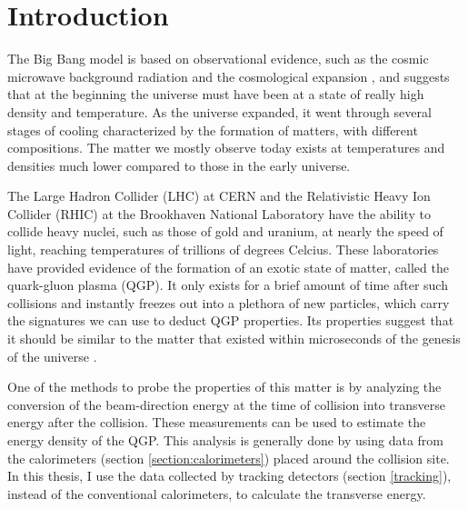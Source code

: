 \chapter{Introduction} \label{ch:introduction}

The Big Bang model is based on observational evidence, such as the cosmic microwave background radiation and the cosmological expansion \cite{Scott:2005uf,Perlmutter:1998np}, and suggests that at the beginning the universe must have been at a state of really high density and temperature. As the universe expanded, it went through several stages of cooling characterized by the formation of matters, with different compositions. The matter we mostly observe today exists at temperatures and densities much lower compared to those in the early universe.

The Large Hadron Collider (LHC) at CERN and the Relativistic Heavy Ion Collider (RHIC) at the Brookhaven National Laboratory have the ability to collide heavy nuclei, such as those of gold and uranium, at nearly the speed of light, reaching temperatures of trillions of degrees Celcius. These laboratories have provided evidence of the formation of an exotic state of matter, called the quark-gluon plasma (QGP). It only exists for a brief amount of time after such collisions and instantly freezes out into a plethora of new particles, which carry the signatures we can use to deduct QGP properties. Its properties suggest that it should be similar to the matter that existed within microseconds of the genesis of the universe%
\cite{ADAMS2005102}.

One of the methods to probe the properties of this matter is by analyzing the conversion of the beam-direction energy at the time of collision into transverse energy after the collision. These measurements can be used to estimate the energy density of the QGP. This analysis is generally done by using data from the calorimeters (section \ref{section:calorimeters}) placed around the collision site. In this thesis, I use the data collected by tracking detectors (section \ref{tracking}), instead of the conventional calorimeters, to calculate the transverse energy.

